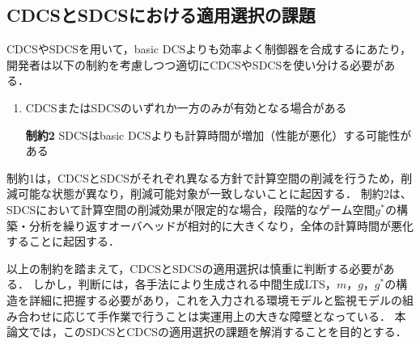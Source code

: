 
\subsection{CDCSとSDCSにおける適用選択の課題}
\label{subsection:limitation}
CDCSやSDCSを用いて，basic DCSよりも効率よく制御器を合成するにあたり，開発者は以下の制約を考慮しつつ適切にCDCSやSDCSを使い分ける必要がある．

\begin{enumerate}[\bf 制約1]
\item CDCSまたはSDCSのいずれか一方のみが有効となる場合がある
\item[\bf 制約2]  SDCSはbasic DCSよりも計算時間が増加（性能が悪化）する可能性がある
\end{enumerate}

制約1は，CDCSとSDCSがそれぞれ異なる方針で計算空間の削減を行うため，削減可能な状態が異なり，削減可能対象が一致しないことに起因する．
制約2は、SDCSにおいて計算空間の削減効果が限定的な場合，段階的なゲーム空間$g^{*}$の構築・分析を繰り返すオーバヘッドが相対的に大きくなり，全体の計算時間が悪化することに起因する．

以上の制約を踏まえて，CDCSとSDCSの適用選択は慎重に判断する必要がある．
しかし，判断には，各手法により生成される中間生成LTS，$m$，$g$，$g^{*}$の構造を詳細に把握する必要があり，これを入力される環境モデルと監視モデルの組み合わせに応じて手作業で行うことは実運用上の大きな障壁となっている．
本論文では，このSDCSとCDCSの適用選択の課題を解消することを目的とする．

